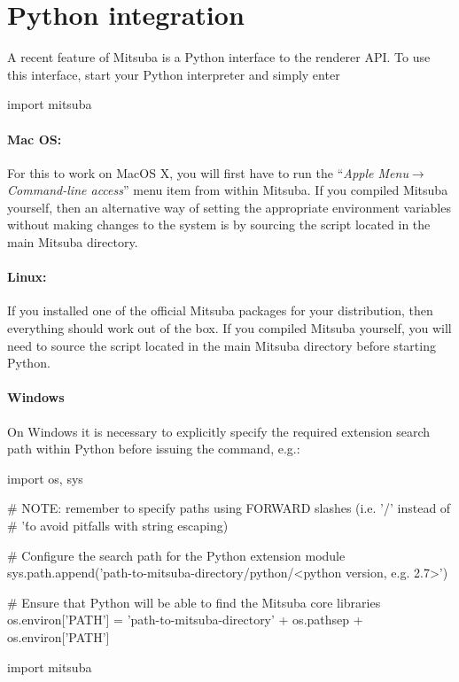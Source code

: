 \section{Python integration}
\label{sec:python}
A recent feature of Mitsuba is a Python interface to the renderer API.
To use this interface, start your Python interpreter and simply enter
\begin{python}
import mitsuba
\end{python}
\paragraph{Mac OS:}
For this to work on MacOS X, you will first have to run the ``\emph{Apple
Menu}$\to$\emph{Command-line access}'' menu item from within Mitsuba.
If you compiled Mitsuba yourself, then an alternative way of setting the appropriate
environment variables without making changes to the system is by sourcing the
 script located in the main Mitsuba directory.

\paragraph{Linux:}
If you installed one of the official Mitsuba packages for your distribution, then everything should work out of the box.
If you compiled Mitsuba yourself, you will need to source the
 script located in the main Mitsuba directory before starting Python.

\paragraph{Windows}
On Windows it is necessary to explicitly specify the required extension search path within Python
before issuing the  command, e.g.:
\begin{python}
import os, sys

# NOTE: remember to specify paths using FORWARD slashes (i.e. '/' instead of
# '\' to avoid pitfalls with string escaping)

# Configure the search path for the Python extension module
sys.path.append('path-to-mitsuba-directory/python/<python version, e.g. 2.7>')

# Ensure that Python will be able to find the Mitsuba core libraries
os.environ['PATH'] = 'path-to-mitsuba-directory' + os.pathsep + os.environ['PATH']

import mitsuba
\end{python}

